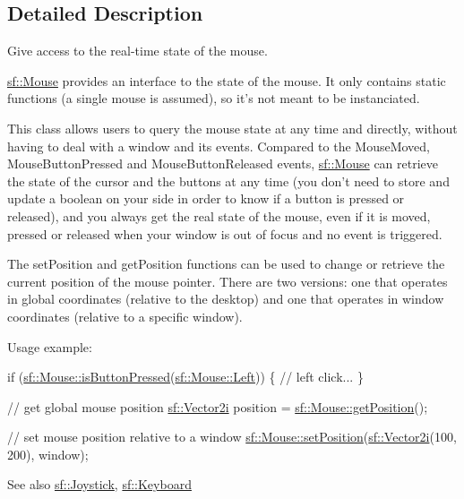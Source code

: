 \subsection{Detailed Description}
Give access to the real-\/time state of the mouse. 

\hyperlink{classsf_1_1_mouse}{sf\+::\+Mouse} provides an interface to the state of the mouse. It only contains static functions (a single mouse is assumed), so it's not meant to be instanciated.

This class allows users to query the mouse state at any time and directly, without having to deal with a window and its events. Compared to the Mouse\+Moved, Mouse\+Button\+Pressed and Mouse\+Button\+Released events, \hyperlink{classsf_1_1_mouse}{sf\+::\+Mouse} can retrieve the state of the cursor and the buttons at any time (you don't need to store and update a boolean on your side in order to know if a button is pressed or released), and you always get the real state of the mouse, even if it is moved, pressed or released when your window is out of focus and no event is triggered.

The set\+Position and get\+Position functions can be used to change or retrieve the current position of the mouse pointer. There are two versions\+: one that operates in global coordinates (relative to the desktop) and one that operates in window coordinates (relative to a specific window).

Usage example\+: 
\begin{DoxyCode}
\textcolor{keywordflow}{if} (\hyperlink{classsf_1_1_mouse_ab647159eb88e369a0332a9c5a7ba6687}{sf::Mouse::isButtonPressed}(\hyperlink{classsf_1_1_mouse_a4fb128be433f9aafe66bc0c605daaa90a8bb4856e1ec7f6b6a8605effdfc0eee8}{sf::Mouse::Left}))
\{
    \textcolor{comment}{// left click...}
\}

\textcolor{comment}{// get global mouse position}
\hyperlink{classsf_1_1_vector2}{sf::Vector2i} position = \hyperlink{classsf_1_1_mouse_ac368680f797b7f6e4f50b5b7928c1387}{sf::Mouse::getPosition}();

\textcolor{comment}{// set mouse position relative to a window}
\hyperlink{classsf_1_1_mouse_a1222e16c583be9e3d176d86e0b7817d7}{sf::Mouse::setPosition}(\hyperlink{classsf_1_1_vector2}{sf::Vector2i}(100, 200), window);
\end{DoxyCode}


\begin{DoxySeeAlso}{See also}
\hyperlink{classsf_1_1_joystick}{sf\+::\+Joystick}, \hyperlink{classsf_1_1_keyboard}{sf\+::\+Keyboard} 
\end{DoxySeeAlso}


